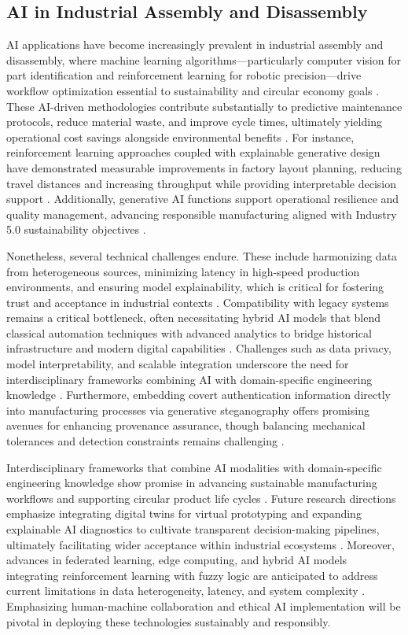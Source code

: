 \documentclass[sigconf]{acmart}
\begin{document}
\subsection{AI in Industrial Assembly and Disassembly}

AI applications have become increasingly prevalent in industrial assembly and disassembly, where machine learning algorithms—particularly computer vision for part identification and reinforcement learning for robotic precision—drive workflow optimization essential to sustainability and circular economy goals \cite{ref6,ref9,ref44}. These AI-driven methodologies contribute substantially to predictive maintenance protocols, reduce material waste, and improve cycle times, ultimately yielding operational cost savings alongside environmental benefits \cite{ref7,ref13}. For instance, reinforcement learning approaches coupled with explainable generative design have demonstrated measurable improvements in factory layout planning, reducing travel distances and increasing throughput while providing interpretable decision support \cite{ref9}. Additionally, generative AI functions support operational resilience and quality management, advancing responsible manufacturing aligned with Industry 5.0 sustainability objectives \cite{ref6}. 

Nonetheless, several technical challenges endure. These include harmonizing data from heterogeneous sources, minimizing latency in high-speed production environments, and ensuring model explainability, which is critical for fostering trust and acceptance in industrial contexts \cite{ref10,ref42}. Compatibility with legacy systems remains a critical bottleneck, often necessitating hybrid AI models that blend classical automation techniques with advanced analytics to bridge historical infrastructure and modern digital capabilities \cite{ref20,ref36}. Challenges such as data privacy, model interpretability, and scalable integration underscore the need for interdisciplinary frameworks combining AI with domain-specific engineering knowledge \cite{ref29}. Furthermore, embedding covert authentication information directly into manufacturing processes via generative steganography offers promising avenues for enhancing provenance assurance, though balancing mechanical tolerances and detection constraints remains challenging \cite{ref10}.

Interdisciplinary frameworks that combine AI modalities with domain-specific engineering knowledge show promise in advancing sustainable manufacturing workflows and supporting circular product life cycles \cite{ref29}. Future research directions emphasize integrating digital twins for virtual prototyping and expanding explainable AI diagnostics to cultivate transparent decision-making pipelines, ultimately facilitating wider acceptance within industrial ecosystems \cite{ref38}. Moreover, advances in federated learning, edge computing, and hybrid AI models integrating reinforcement learning with fuzzy logic are anticipated to address current limitations in data heterogeneity, latency, and system complexity \cite{ref36,ref44}. Emphasizing human-machine collaboration and ethical AI implementation will be pivotal in deploying these technologies sustainably and responsibly.
\end{document}
